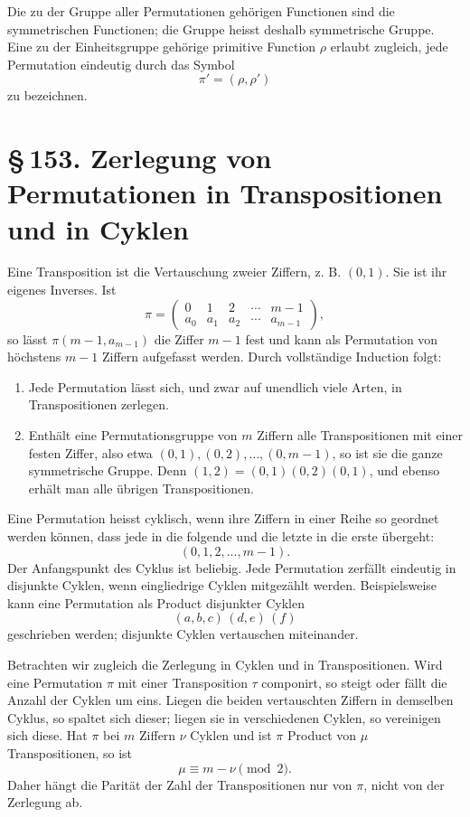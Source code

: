 \documentclass[11pt]{article}
\providecommand{\sect}[2]{\section*{\S\,#1. #2}}
\providecommand{\perm}[2]{\begin{pmatrix}#1\\#2\end{pmatrix}}
\begin{document}
Die zu der Gruppe aller Permutationen gehörigen Functionen sind die symmetrischen Functionen; die Gruppe heisst deshalb symmetrische Gruppe. Eine zu der Einheitsgruppe gehörige primitive Function $\rho$ erlaubt zugleich, jede Permutation eindeutig durch das Symbol
\[
        \pi'=(\rho,\rho')
\]
zu bezeichnen.

\sect{153}{Zerlegung von Permutationen in Transpositionen und in Cyklen}

Eine Transposition ist die Vertauschung zweier Ziffern, z. B. $(0,1)$. Sie ist ihr eigenes Inverses. Ist
\[
        \pi=\perm{0&1&2&\cdots&m-1}{a_0&a_1&a_2&\cdots&a_{m-1}},
\]
so lässt $\pi(m-1,a_{m-1})$ die Ziffer $m-1$ fest und kann als Permutation von höchstens $m-1$ Ziffern aufgefasst werden. Durch vollständige Induction folgt:

\begin{enumerate}[label=\arabic*.,leftmargin=2em]
\item Jede Permutation lässt sich, und zwar auf unendlich viele Arten, in Transpositionen zerlegen.
\item Enthält eine Permutationsgruppe von $m$ Ziffern alle Transpositionen mit einer festen Ziffer, also etwa $(0,1),(0,2),\ldots,(0,m-1)$, so ist sie die ganze symmetrische Gruppe. Denn $(1,2)=(0,1)(0,2)(0,1)$, und ebenso erhält man alle übrigen Transpositionen.
\end{enumerate}

Eine Permutation heisst cyklisch, wenn ihre Ziffern in einer Reihe so geordnet werden können, dass jede in die folgende und die letzte in die erste übergeht:
\[
        (0,1,2,\ldots,m-1).
\]
Der Anfangspunkt des Cyklus ist beliebig. Jede Permutation zerfällt eindeutig in disjunkte Cyklen, wenn eingliedrige Cyklen mitgezählt werden. Beispielsweise kann eine Permutation als Product disjunkter Cyklen
\[
        (a,b,c)\,(d,e)\,(f)
\]
geschrieben werden; disjunkte Cyklen vertauschen miteinander.

Betrachten wir zugleich die Zerlegung in Cyklen und in Transpositionen. Wird eine Permutation $\pi$ mit einer Transposition $\tau$ componirt, so steigt oder fällt die Anzahl der Cyklen um eins. Liegen die beiden vertauschten Ziffern in demselben Cyklus, so spaltet sich dieser; liegen sie in verschiedenen Cyklen, so vereinigen sich diese. Hat $\pi$ bei $m$ Ziffern $\nu$ Cyklen und ist $\pi$ Product von $\mu$ Transpositionen, so ist
\[
        \mu\equiv m-\nu \pmod 2.
\]
Daher hängt die Parität der Zahl der Transpositionen nur von $\pi$, nicht von der Zerlegung ab.
\end{document}
